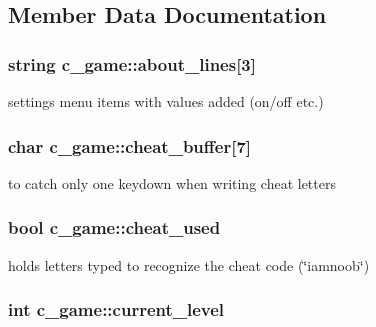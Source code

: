 \subsection{Member Data Documentation}
\hypertarget{classc__game_a115ab11c275a3e00df3a7c0a247f61e9}{
\subsubsection[{about\-\_\-lines}]{\setlength{\rightskip}{0pt plus 5cm}string c\-\_\-game\-::about\-\_\-lines\mbox{[}3\mbox{]}\hspace{0.3cm}{\ttfamily [protected]}}}\label{classc__game_a115ab11c275a3e00df3a7c0a247f61e9}
settings menu items with values added (on/off etc.) \hypertarget{classc__game_ab13d9ba9025a290671b663f4163ada9c}{
\subsubsection[{cheat\-\_\-buffer}]{\setlength{\rightskip}{0pt plus 5cm}char c\-\_\-game\-::cheat\-\_\-buffer\mbox{[}7\mbox{]}\hspace{0.3cm}{\ttfamily [protected]}}}\label{classc__game_ab13d9ba9025a290671b663f4163ada9c}
to catch only one keydown when writing cheat letters \hypertarget{classc__game_a818510abc8ca17bab74a2e9e02897015}{
\subsubsection[{cheat\-\_\-used}]{\setlength{\rightskip}{0pt plus 5cm}bool c\-\_\-game\-::cheat\-\_\-used\hspace{0.3cm}{\ttfamily [protected]}}}\label{classc__game_a818510abc8ca17bab74a2e9e02897015}
holds letters typed to recognize the cheat code (\char`\"{}iamnoob\char`\"{}) \hypertarget{classc__game_a6279909358cd7d29a187ffcee9d621d8}{
\subsubsection[{current\-\_\-level}]{\setlength{\rightskip}{0pt plus 5cm}int c\-\_\-game\-::current\-\_\-level\hspace{0.3cm}{\ttfamily [protected]}}}\label{classc__game_a6279909358cd7d29a187ffcee9d621d8}
